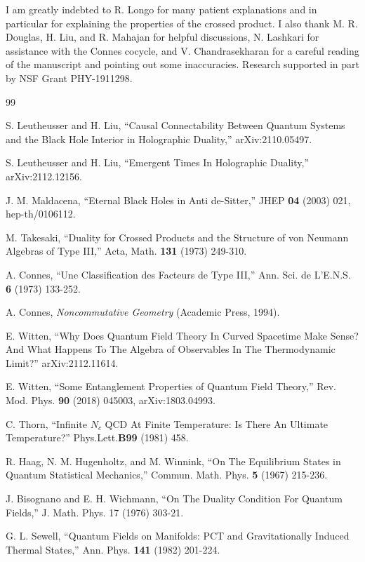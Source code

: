 \documentclass[11pt,a4paper]{article}
\begin{document}
\vskip1cm
   I am greatly indebted to R. Longo for many patient explanations  and in particular for explaining
 the properties of the crossed product.   I also
 thank M. R. Douglas, H. Liu, and R. Mahajan for helpful discussions, N. Lashkari for assistance with the Connes cocycle, and V. Chandrasekharan
 for a careful reading of the manuscript and pointing out some inaccuracies.
 Research supported in part by NSF Grant PHY-1911298.
 
\begin{thebibliography}{99}

S. Leutheusser and H. Liu, ``Causal Connectability
Between Quantum Systems and the Black Hole Interior in Holographic Duality,''
arXiv:2110.05497.

 S. Leutheusser and H. Liu, ``Emergent Times In Holographic Duality,'' arXiv:2112.12156.

J. M. Maldacena, ``Eternal Black Holes in Anti de-Sitter,''
JHEP {\bf 04} (2003) 021, hep-th/0106112.

M. Takesaki, ``Duality for Crossed Products and the Structure of von Neumann Algebras of
Type III,'' Acta, Math. {\bf 131} (1973) 249-310.

A. Connes, ``Une Classification des Facteurs de Type III,'' Ann. Sci. de L'E.N.S. {\bf 6} (1973) 133-252.

A. Connes, {\it Noncommutative Geometry} (Academic Press, 1994).

 E. Witten, ``Why Does Quantum Field Theory In Curved Spacetime Make Sense? 
And What Happens To The Algebra of Observables In The Thermodynamic Limit?'' arXiv:2112.11614.

 E. Witten, ``Some Entanglement Properties of Quantum Field Theory,''
Rev. Mod. Phys. {\bf 90} (2018)  045003, arXiv:1803.04993.

C. Thorn, ``Infinite $N_c$ QCD At Finite Temperature: Is There An Ultimate Temperature?''
Phys.Lett.{\bf B99} (1981) 458.

R. Haag, N. M. Hugenholtz, and M. Winnink, ``On The Equilibrium States in
Quantum Statistical Mechanics,'' Commun. Math. Phys. {\bf 5} (1967) 215-236.

J. Bisognano and E. H. Wichmann, ``On The Duality Condition For Quantum Fields,'' J. Math.
Phys. 17 (1976) 303-21.


G. L.  Sewell,
``Quantum Fields on Manifolds: PCT and Gravitationally Induced Thermal States,''
Ann. Phys. {\bf 141} (1982) 201-224.



\end{thebibliography}
\end{document}
